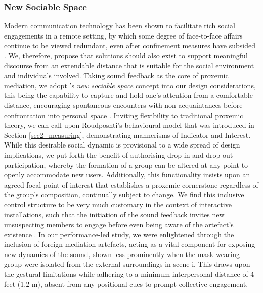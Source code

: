 \subsubsection{New Sociable Space}
Modern communication technology has been shown to facilitate rich social engagements in a remote setting, by which some degree of face-to-face affairs continue to be viewed redundant, even after confinement measures have subsided \citep{cotofan_work_2021}. We, therefore, propose that solutions should also exist to support meaningful discourse from an extendable distance that is suitable for the social environment and individuals involved. Taking sound feedback as the core of proxemic mediation, we adopt \citeauthor{mehta_new_2020}'s \textit{new sociable space} concept into our design considerations, this being the capability to capture and hold one's attention from a comfortable distance, encouraging spontaneous encounters with non-acquaintances before confrontation into personal space \cite{mehta_new_2020}. Inviting flexibility to traditional proxemic theory, we can call upon Roudposhti's behavioural model that was introduced in Section \ref{sec2_measuring}, demonstrating mannerisms of Indicator and Interest.
While this desirable social dynamic is provisional to a wide spread of design implications, we put forth the benefit of authorising drop-in and drop-out participation, whereby the formation of a group can be altered at any point to openly accommodate new users. Additionally, this functionality insists upon an agreed focal point of interest that establishes a proxemic cornerstone regardless of the group's composition, continually subject to change. We find this inclusive control structure to be very much customary in the context of interactive installations, such that the initiation of the sound feedback invites new unsuspecting members to engage before even being aware of the artefact's existence \citep{goudarzi_engagement_2016,rostami_bio-sensed_2017}. In our performance-led study, we were enlightened through the inclusion of foreign mediation artefacts, acting as a vital component for exposing new dynamics of the sound, shown less prominently when the mask-wearing group were isolated from the external surroundings in scene i. This draws upon the gestural limitations while adhering to a minimum interpersonal distance of 4 feet (1.2 m), absent from any positional cues to prompt collective engagement.

